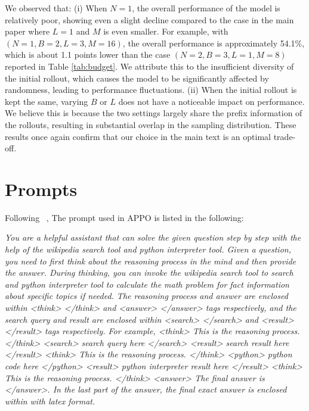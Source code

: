 \documentclass{llmxive}
\begin{document}
We observed that: (i) When $N=1$, the overall performance of the model is relatively poor, showing even a slight decline compared to the case in the main paper where $L=1$ and $M$ is even smaller. For example, with $(N=1, B=2, L=3, M=16)$, the overall performance is approximately 54.1\%, which is about 1.1 points lower than the case $(N=2, B=3, L=1, M=8)$ reported in Table \ref{tab:budget}. We attribute this to the insufficient diversity of the initial rollout, which causes the model to be significantly affected by randomness, leading to performance fluctuations. (ii) When the initial rollout is kept the same, varying $B$ or $L$ does not have a noticeable impact on performance. We believe this is because the two settings largely share the prefix information of the rollouts, resulting in substantial overlap in the sampling distribution. These results once again confirm that our choice in the main text is an optimal trade-off.



\section{Prompts}\label{appx:f} 
Following ~\cite{dong2025agentic}, The prompt used in APPO is listed in the following:

\begin{tcolorbox}[
  colback=gray!10,     %
  colframe=black,      %
  boxrule=1pt,         %
  arc=2mm,             %
  left=4pt,right=4pt,top=4pt,bottom=4pt, %
] 

 \textit{You are a helpful assistant that can solve the given question step by step with the help of the wikipedia search tool and python interpreter tool.  
Given a question, you need to first think about the reasoning process in the mind and then provide the answer. 
During thinking, you can invoke the wikipedia search tool to search and python interpreter tool to calculate the math problem for fact information about specific topics if needed. 
The reasoning process and answer are enclosed within <think> </think> and <answer> </answer> tags respectively,  
and the search query and result are enclosed within <search> </search> and <result> </result> tags respectively.  
For example, <think> This is the reasoning process. </think> <search> search query here </search> <result> search result here </result>  
<think> This is the reasoning process. </think> <python> python code here </python> <result> python interpreter result here </result> 
<think> This is the reasoning process. </think> <answer> The final answer is    </answer>.  
In the last part of the answer, the final exact answer is enclosed within \boxed{} with latex format. }
 
\end{tcolorbox}
\end{document}
